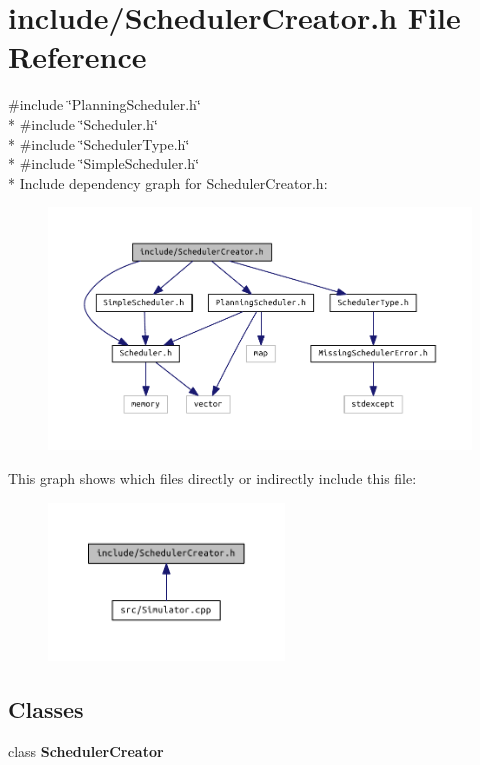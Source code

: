 \section{include/\+Scheduler\+Creator.h File Reference}
\label{_scheduler_creator_8h}
{\ttfamily \#include \char`\"{}Planning\+Scheduler.\+h\char`\"{}}\\*
{\ttfamily \#include \char`\"{}Scheduler.\+h\char`\"{}}\\*
{\ttfamily \#include \char`\"{}Scheduler\+Type.\+h\char`\"{}}\\*
{\ttfamily \#include \char`\"{}Simple\+Scheduler.\+h\char`\"{}}\\*
Include dependency graph for Scheduler\+Creator.\+h\+:\nopagebreak
\begin{figure}[H]
\begin{center}
\leavevmode
\includegraphics[width=350pt]{_scheduler_creator_8h__incl}
\end{center}
\end{figure}
This graph shows which files directly or indirectly include this file\+:\nopagebreak
\begin{figure}[H]
\begin{center}
\leavevmode
\includegraphics[width=178pt]{_scheduler_creator_8h__dep__incl}
\end{center}
\end{figure}
\subsection*{Classes}
\begin{DoxyCompactItemize}
\item 
class {\bf Scheduler\+Creator}
\end{DoxyCompactItemize}
